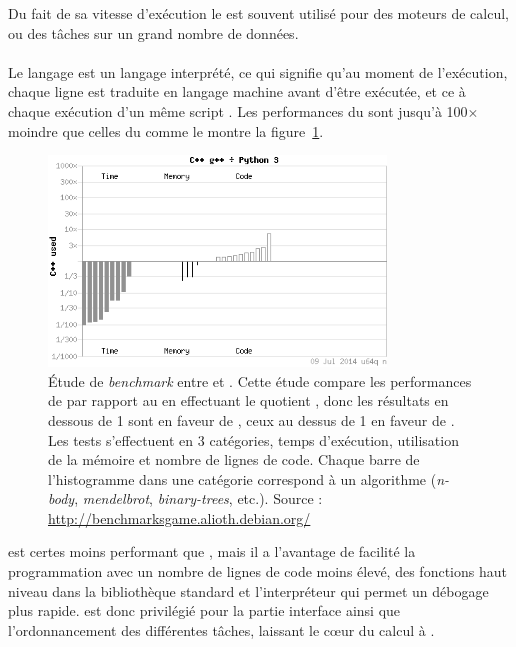 Du fait de sa vitesse d'exécution le \Cpp{} est souvent utilisé pour des moteurs de calcul, ou des tâches sur un grand nombre de données.

			\paragraph{\Python}
Le langage \Python{} est un langage interprété, ce qui signifie qu'au moment de l'exécution, chaque ligne est traduite en langage machine avant d'être exécutée, et ce à chaque exécution d'un même script \Python. Les performances du \Python{} sont jusqu'à 100$\times$ moindre que celles du \Cpp{} comme le montre la figure~\ref{fig:cpp-py}.
	\begin{figure}
		\centering
		\includegraphics[width=0.8\textwidth]{img/cpp-py.png}
		\caption[\emph{Benchmark} entre \Cpp{} et \Python]{Étude de \emph{benchmark} entre \Cpp{} et \Python{}. Cette étude compare les performances de \Python{} par rapport au \Cpp{} en effectuant le quotient , donc les résultats en dessous de 1 sont en faveur de \Cpp{}, ceux au dessus de 1 en faveur de \Python{}. Les tests s'effectuent en 3 catégories, temps d'exécution, utilisation de la mémoire et nombre de lignes de code. Chaque barre de l'histogramme dans une catégorie correspond à un algorithme (\emph{n-body}, \emph{mendelbrot}, \emph{binary-trees}, etc.). Source : \url{http://benchmarksgame.alioth.debian.org/}}
		\label{fig:cpp-py}
	\end{figure}
\Python{} est certes moins performant que \Cpp{}, mais il a l'avantage de facilité la programmation avec un nombre de lignes de code moins élevé, des fonctions haut niveau dans la bibliothèque standard et l'interpréteur qui permet un débogage plus rapide. \Python{} est donc privilégié pour la partie interface ainsi que l'ordonnancement des différentes tâches, laissant le cœur du calcul à \Cpp{}.


